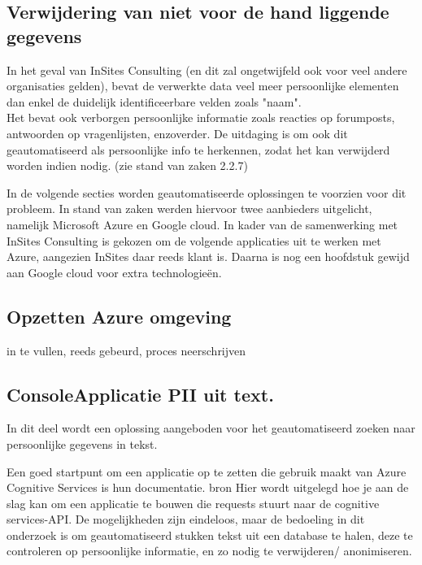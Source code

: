 \subsection{Verwijdering van niet voor de hand liggende gegevens}

In het geval van InSites Consulting (en dit zal ongetwijfeld ook voor veel andere organisaties gelden), bevat de verwerkte data veel meer persoonlijke elementen dan enkel de duidelijk identificeerbare velden zoals "naam". \\
Het bevat ook verborgen persoonlijke informatie zoals reacties op forumposts, antwoorden op vragenlijsten, enzoverder. De uitdaging is om ook dit geautomatiseerd als persoonlijke info te herkennen, zodat het kan verwijderd worden indien nodig. (zie stand van zaken 2.2.7)

In de volgende secties worden geautomatiseerde oplossingen te voorzien voor dit probleem. 
In stand van zaken werden hiervoor twee aanbieders uitgelicht, namelijk Microsoft Azure en Google cloud. In kader van de samenwerking met InSites Consulting is gekozen om de volgende applicaties uit te werken met Azure, aangezien InSites daar reeds klant is. Daarna is nog een hoofdstuk gewijd aan Google cloud voor extra technologieën. 

\subsection{Opzetten Azure omgeving}
in te vullen, reeds gebeurd, proces neerschrijven 


\subsection{ConsoleApplicatie PII uit text.}
In dit deel wordt een oplossing aangeboden voor het geautomatiseerd zoeken naar persoonlijke gegevens in tekst. 

Een goed startpunt om een applicatie op te zetten die gebruik maakt van Azure Cognitive Services is hun documentatie. 
bron %
Hier wordt uitgelegd hoe je aan de slag kan om een applicatie te bouwen die requests stuurt naar de cognitive services-API. De mogelijkheden zijn eindeloos, maar de bedoeling in dit onderzoek is om geautomatiseerd stukken tekst uit een database te halen, deze te controleren op persoonlijke informatie, en zo nodig te verwijderen/ anonimiseren. 



